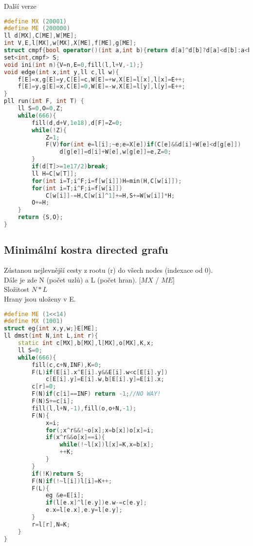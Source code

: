 \documentclass[11pt]{article}
\begin{document}
Další verze
\begin{lstlisting}[language=C++]
#define MX (20001)
#define ME (200000)
ll d[MX],C[ME],W[ME];
int V,E,l[MX],w[MX],X[ME],f[ME],g[ME]; 
struct cmpf{bool operator()(int a,int b){return d[a]^d[b]?d[a]<d[b]:a<b;}};
set<int,cmpf> S;
void ini(int n){V=n,E=0,fill(l,l+V,-1);}
void edge(int x,int y,ll c,ll w){
    f[E]=x,g[E]=y,C[E]=c,W[E]=+w,X[E]=l[x],l[x]=E++;
    f[E]=y,g[E]=x,C[E]=0,W[E]=-w,X[E]=l[y],l[y]=E++;
}
pll run(int F, int T) {
    ll S=0,O=0,Z;
    while(666){
        fill(d,d+V,1e18),d[F]=Z=0;
        while(!Z){
            Z=1;
            F(V)for(int e=l[i];~e;e=X[e])if(C[e]&&d[i]+W[e]<d[g[e]])
                d[g[e]]=d[i]+W[e],w[g[e]]=e,Z=0;
        }
        if(d[T]>=1e17/2)break;
        ll H=C[w[T]];
        for(int i=T;i^F;i=f[w[i]])H=min(H,C[w[i]]);
        for(int i=T;i^F;i=f[w[i]])
            C[w[i]]-=H,C[w[i]^1]+=H,S+=W[w[i]]*H;
        O+=H;
    }
    return {S,O};
}
\end{lstlisting}
\subsection{Minimální kostra directed grafu}
Zústanou nejlevnější cesty z rootu (\textsf{r}) do všech nodes (indexace od 0).
\\Dále je zde \textsf{N} (počet uzlů) a \textsf{L} (počet hran). [$MX$ / $ME$]
\\Složitost $N*L$
\\Hrany jsou uloženy v \textsf{E}.
\begin{lstlisting}[language=C++]
#define ME (1<<14)
#define MX (1001)
struct eg{int x,y,w;}E[ME];
ll dmst(int N,int L,int r){
    static int c[MX],b[MX],l[MX],o[MX],K,x;
    ll S=0;
    while(666){
        fill(c,c+N,INF),K=0;
        F(L)if(E[i].x^E[i].y&&E[i].w<c[E[i].y])
            c[E[i].y]=E[i].w,b[E[i].y]=E[i].x;
        c[r]=0;
        F(N)if(c[i]==INF) return -1;//NO WAY!
        F(N)S+=c[i];
        fill(l,l+N,-1),fill(o,o+N,-1);
        F(N){
            x=i;
            for(;x^r&&!~o[x];x=b[x])o[x]=i;
            if(x^r&&o[x]==i){
                while(!~l[x])l[x]=K,x=b[x];
                ++K;
            }
        }
        if(!K)return S;
        F(N)if(!~l[i])l[i]=K++;
        F(L){
            eg &e=E[i];
            if(l[e.x]^l[e.y])e.w-=c[e.y];
            e.x=l[e.x],e.y=l[e.y];
        }
        r=l[r],N=K;
    }
}
\end{lstlisting}
\end{document}

